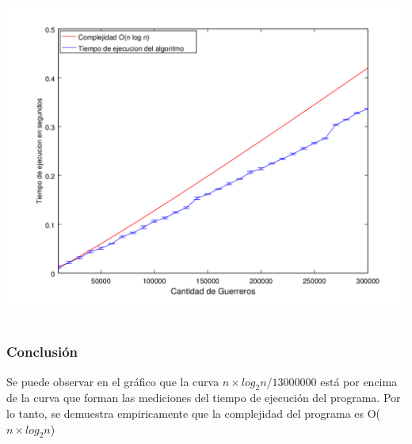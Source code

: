       \includegraphics[height=11cm]{graficos/kaioken-exp.png}



		\subsubsection*{Conclusión}
			Se puede observar en el gráfico que la curva $n \times log_{2}n / 13000000$ está por encima de la curva que forman las mediciones del tiempo de ejecución del programa. Por lo tanto, se demuestra empiricamente que la complejidad del programa es O($n \times log_{2}n$)

